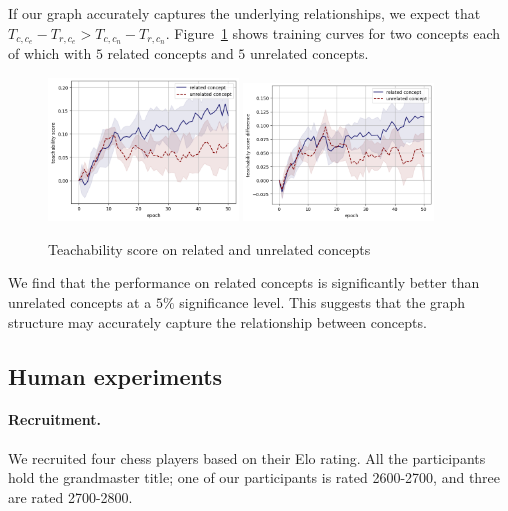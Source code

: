 \documentclass{article}
\begin{document}
If our graph accurately captures the underlying relationships, we expect that $T_{c, c_e} - T_{r, c_e} > T_{c, c_n} -T_{r, c_n}$. 
Figure~\ref{fig:retrain_concept} shows training curves for
two concepts each of which with $5$ related concepts and $5$ unrelated concepts. 

\begin{figure}[!ht]
\caption{Teachability score on related and unrelated concepts}
\centering
\includegraphics[width=0.45\textwidth]{images/t1_graph.png}
\hspace{0.02\textwidth}
\includegraphics[width=0.45\textwidth]{images/t4_graph.png}
\label{fig:retrain_concept}
\end{figure}
\FloatBarrier

We find that the performance on related concepts is significantly better than unrelated concepts at a $5 \%$ significance level. This suggests that the graph structure may accurately capture the relationship between concepts. 

\subsection{Human experiments} \label{appx:human}

\paragraph{Recruitment.}
We recruited four chess players based on their Elo rating. All the participants hold the grandmaster title; one of our participants is rated 2600-2700, and three are rated 2700-2800. 
\end{document}
